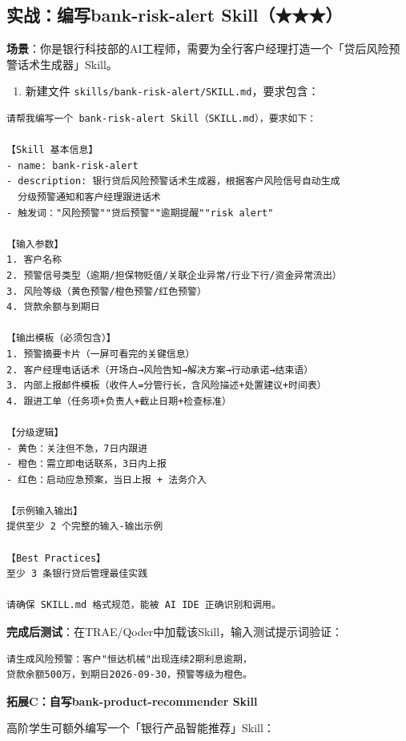 \subsection{实战：编写bank-risk-alert Skill（★★★）}

\textbf{场景}：你是银行科技部的AI工程师，需要为全行客户经理打造一个「贷后风险预警话术生成器」Skill。

\begin{enumerate}[leftmargin=2em]
  \item 新建文件 \texttt{skills/bank-risk-alert/SKILL.md}，要求包含：
\end{enumerate}

\begin{lstlisting}
请帮我编写一个 bank-risk-alert Skill（SKILL.md），要求如下：

【Skill 基本信息】
- name: bank-risk-alert
- description: 银行贷后风险预警话术生成器，根据客户风险信号自动生成
  分级预警通知和客户经理跟进话术
- 触发词："风险预警""贷后预警""逾期提醒""risk alert"

【输入参数】
1. 客户名称
2. 预警信号类型（逾期/担保物贬值/关联企业异常/行业下行/资金异常流出）
3. 风险等级（黄色预警/橙色预警/红色预警）
4. 贷款余额与到期日

【输出模板（必须包含）】
1. 预警摘要卡片（一屏可看完的关键信息）
2. 客户经理电话话术（开场白→风险告知→解决方案→行动承诺→结束语）
3. 内部上报邮件模板（收件人=分管行长，含风险描述+处置建议+时间表）
4. 跟进工单（任务项+负责人+截止日期+检查标准）

【分级逻辑】
- 黄色：关注但不急，7日内跟进
- 橙色：需立即电话联系，3日内上报
- 红色：启动应急预案，当日上报 + 法务介入

【示例输入输出】
提供至少 2 个完整的输入-输出示例

【Best Practices】
至少 3 条银行贷后管理最佳实践

请确保 SKILL.md 格式规范，能被 AI IDE 正确识别和调用。
\end{lstlisting}

\textbf{完成后测试}：在TRAE/Qoder中加载该Skill，输入测试提示词验证：

\begin{lstlisting}
请生成风险预警：客户"恒达机械"出现连续2期利息逾期，
贷款余额500万，到期日2026-09-30，预警等级为橙色。
\end{lstlisting}

\textbf{拓展C：自写bank-product-recommender Skill}

高阶学生可额外编写一个「银行产品智能推荐」Skill：


